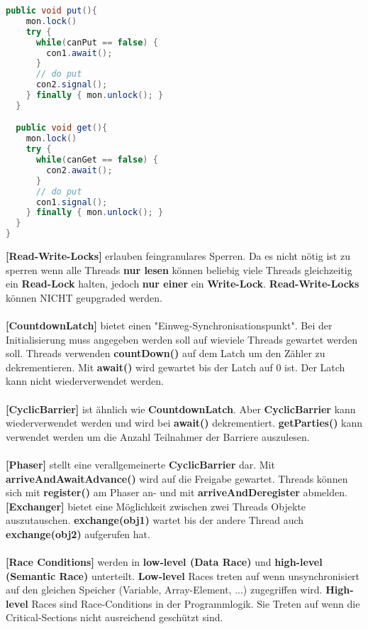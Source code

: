 \documentclass[8pt]{extarticle}
\let\oldtextbf\textbf
\renewcommand{\textbf}{\tiny\oldtextbf}
\begin{document}
\begin{multicols*}{5}
\begin{lstlisting}[language=java]
  public void put(){
    mon.lock()
    try {
      while(canPut == false) {
        con1.await();
      }
      // do put
      con2.signal();
    } finally { mon.unlock(); }
  }

  public void get(){
    mon.lock()
    try {
      while(canGet == false) {
        con2.await();
      }
      // do put
      con1.signal();
    } finally { mon.unlock(); }
  }
}
\end{lstlisting}
\textbf{[Read-Write-Locks]} erlauben feingranulares Sperren. Da es nicht nötig ist zu sperren wenn alle Threads \textbf{nur lesen} können beliebig viele Threads gleichzeitig ein \textbf{Read-Lock} halten, jedoch \textbf{nur einer} ein \textbf{Write-Lock}. \textbf{Read-Write-Locks} können NICHT geupgraded werden.\\\\
\textbf{[CountdownLatch]} bietet einen "Einweg-Synchronisationspunkt". Bei der Initialisierung muss angegeben werden soll auf wieviele Threads gewartet werden soll. Threads verwenden \textbf{countDown()} auf dem Latch um den Zähler zu dekrementieren. Mit \textbf{await()} wird gewartet bis der Latch auf 0 ist. Der Latch kann nicht wiederverwendet werden.\\\\
\textbf{[CyclicBarrier]} ist ähnlich wie \textbf{CountdownLatch}. Aber \textbf{CyclicBarrier} kann wiederverwendet werden und wird bei \textbf{await()} dekrementiert. \textbf{getParties()} kann verwendet werden um die Anzahl Teilnahmer der Barriere auszulesen.\\\\
\textbf{[Phaser]} stellt eine verallgemeinerte \textbf{CyclicBarrier} dar. Mit \textbf{arriveAndAwaitAdvance()} wird auf die Freigabe gewartet. Threads können sich mit \textbf{register()} am Phaser an- und mit \textbf{arriveAndDeregister} abmelden.\\
\textbf{[Exchanger]} bietet eine Möglichkeit zwischen zwei Threads Objekte auszutauschen. \textbf{exchange(obj1)} wartet bis der andere Thread auch \textbf{exchange(obj2)} aufgerufen hat.\\\\
\textbf{[Race Conditions]} werden in \textbf{low-level (Data Race)} und \textbf{high-level (Semantic Race)} unterteilt. \textbf{Low-level} Races treten auf wenn unsynchronisiert auf den gleichen Speicher (Variable, Array-Element, ...) zugegriffen wird. \textbf{High-level} Races sind Race-Conditions in der Programmlogik. Sie Treten auf wenn die Critical-Sections nicht ausreichend geschützt sind.\\\\

\end{multicols*}
\end{document}

